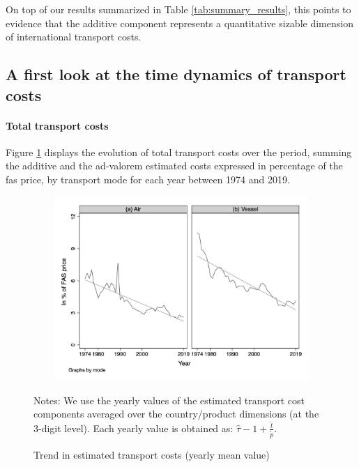 \documentclass[a4paper,11pt]{article}
\begin{document}
On top of our results summarized in Table \ref{tab:summary_results}, this points to evidence that the additive component represents a quantitative sizable dimension of international transport costs.\smallskip


\subsection{A first look at the time dynamics of transport costs}


\paragraph{Total transport costs} Figure \ref{fig:Trends_in_TC} displays the evolution of total transport costs over the period, summing the additive and the ad-valorem estimated costs expressed in percentage of the fas price, by transport mode for each year between 1974 and 2019.

\begin{figure}[htbp]
\caption{Trend in estimated transport costs (yearly mean value)}
\label{fig:Trends_in_TC}
\begin{center}
\includegraphics[width=14cm, height=7cm]{Figure2_Trend_of_totalTC_bymode.jpg}

\begin{minipage} [c]  {5in} \scriptsize%
Notes: We use the yearly values of the estimated transport cost components averaged over the country/product dimensions (at the 3-digit level). Each yearly value is obtained as: $\widehat{\tau}-1+\frac{\widehat{t}}{\widetilde{p}}$.
\end{minipage}
\end{center}
\end{figure}
\end{document}
